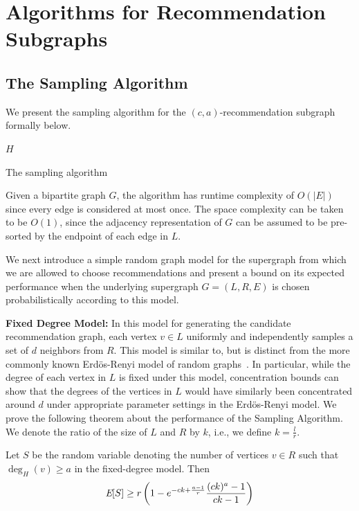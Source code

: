 \section{Algorithms for Recommendation Subgraphs}

\subsection{The Sampling Algorithm}
\label{fixed-degree}

We present the sampling algorithm for the $(c,a)$-recommendation subgraph formally below.

\begin{algorithm}[h]
  \SetAlgoLined
  \Return $H$\;
  \caption{The sampling algorithm}
\end{algorithm}\vs

Given a bipartite graph $G$, the algorithm has runtime complexity of
$O(|E|)$ since every edge is considered at most once. The space
complexity can be taken to be $O(1)$, since the adjacency representation
of $G$ can be assumed to be pre-sorted by the endpoint of each edge in $L$.\vs

We next introduce a simple random graph model for the supergraph from
which we are allowed to choose recommendations and present a bound on
its expected performance when the underlying supergraph $G=(L,R,E)$ is
chosen probabilistically according to this model.
\vs

{\bf Fixed Degree Model:} In this model for generating the candidate 
recommendation graph, each vertex $v\in L$
uniformly and independently samples a set of $d$ neighbors from $R$.
This model is similar to, but is distinct from the more commonly
known Erd\"{o}s-Renyi model of random graphs~\cite{janson2011random}. In particular, while the
degree of each vertex in $L$ is fixed under this model, concentration
bounds can show that the degrees of the vertices in $L$ would have
similarly been concentrated around $d$ under appropriate parameter
settings in the Erd\"{o}s-Renyi model. 
We prove the following theorem about the performance
of the Sampling Algorithm. We denote the ratio of the size of $L$ and $R$ by $k$, i.e., we define $k = \frac{l}{r}$.

\begin{thm}\label{original_result}
Let $S$ be the
random variable denoting the number of vertices $v \in R$ such that
$\deg_{H}(v)\geq a$ in the fixed-degree model. Then
\[ \emph{\text{E}}[S] \geq r\left(1-e^{-ck+\frac{a-1}{r}}\frac{(ck)^a-1}{ck-1}\right)  \]
\end{thm}

